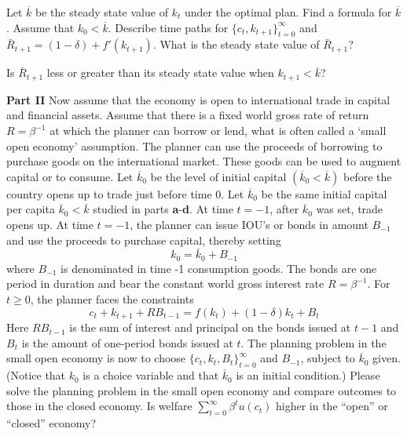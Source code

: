 \medskip
\noindent
Let $\overline{k}$ be the steady state value of $k_t$ under the optimal plan.
\medskip
{} Find a formula for $\overline{k}$.
\medskip
{} Assume that $k_0<\overline{k}$. Describe time paths for $\{c_t,k_{t+1}\}_{t=0}^\infty$ and $\bar R_{t+1}=(1-\delta) + f'(k_{t+1})$.
\medskip
{} What is the steady state value of $\bar R_{t+1}$?\medskip

 Is $\bar R_{t+1}$ less or greater than its steady state value when $k_{t+1} < \overline{k}$?

\medskip\noindent
{\bf Part  II}
\medskip \noindent
Now assume that the economy is open to international trade in capital and financial assets. Assume that there is a fixed world gross rate of return $R=\beta^{-1}$ at which the planner can borrow or lend, what is often called a `small open economy' assumption.
The planner can use the proceeds of borrowing to purchase goods on the international market. These goods can be used to augment capital or to consume.\medskip \noindent
Let $\overline{k}_0$ be the level of initial capital $(\overline{k}_0<\overline{k})$ before the country opens up to trade just before time 0.  Let $\overline{k}_0$ be the same initial capital per capita $\overline{k}_0 < \overline{k}$ studied in parts {\bf a}-{\bf d}.\medskip \noindent
At time $t=-1$, after $\overline{k}_0$ was set, trade opens up. At time $t=-1$, the planner can issue IOU's or bonds in amount $B_{-1}$ and use the proceeds to purchase capital, thereby setting
$$k_0=\overline{k}_0+B_{-1} $$
where $B_{-1}$ is denominated in time -1 consumption goods. The bonds are one period in duration and bear the constant world gross interest rate $R=\beta^{-1}$.
For $t\geq 0$, the planner faces the constraints
$$ c_t+k_{t+1}+RB_{t-1}=f(k_t)+(1-\delta)k_t+B_t$$
Here $RB_{t-1}$ is the sum of interest and  principal on the bonds issued at $t-1$ and $B_t$ is the amount of one-period bonds issued at $t$. \medskip \noindent
The planning problem in the small open economy is now to choose $\{c_t,k_{t},B_t\}_{t=0}^\infty$ and $B_{-1}$, subject to $\overline{k}_0$ given. (Notice that $k_0$ is a choice variable and that $\overline{k}_0$ is an initial condition.)
Please solve the  planning problem in the small open economy and compare outcomes to those in the closed economy.
 Is  welfare $\sum_{t=0}^\infty \beta^t u(c_t)$ higher in the ``open'' or ``closed'' economy?



\medskip

\bigskip


